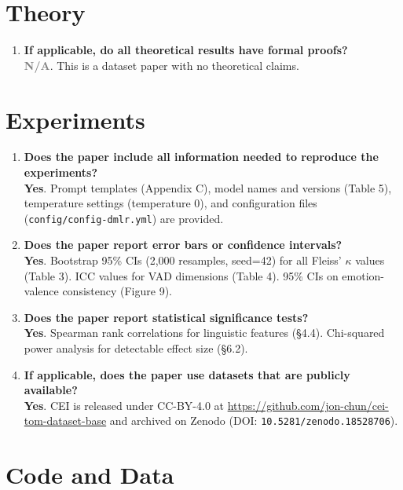 \documentclass[11pt]{article}
\newcommand{\yes}{\textcolor{green!60!black}{\textbf{Yes}}}
\newcommand{\na}{\textcolor{gray}{\textbf{N/A}}}
\begin{document}
\section{Theory}

\begin{enumerate}[leftmargin=*]
    \item \textbf{If applicable, do all theoretical results have formal proofs?} \\
    \na. This is a dataset paper with no theoretical claims.
\end{enumerate}

\section{Experiments}

\begin{enumerate}[leftmargin=*]
    \item \textbf{Does the paper include all information needed to reproduce the experiments?} \\
    \yes. Prompt templates (Appendix C), model names and versions (Table 5), temperature settings (temperature 0), and configuration files (\texttt{config/config-dmlr.yml}) are provided.

    \item \textbf{Does the paper report error bars or confidence intervals?} \\
    \yes. Bootstrap 95\% CIs (2,000 resamples, seed=42) for all Fleiss' $\kappa$ values (Table 3). ICC values for VAD dimensions (Table 4). 95\% CIs on emotion-valence consistency (Figure 9).

    \item \textbf{Does the paper report statistical significance tests?} \\
    \yes. Spearman rank correlations for linguistic features (\S4.4). Chi-squared power analysis for detectable effect size (\S6.2).

    \item \textbf{If applicable, does the paper use datasets that are publicly available?} \\
    \yes. CEI is released under CC-BY-4.0 at \url{https://github.com/jon-chun/cei-tom-dataset-base} and archived on Zenodo (DOI: \texttt{10.5281/zenodo.18528706}).
\end{enumerate}

\section{Code and Data}
\end{document}
